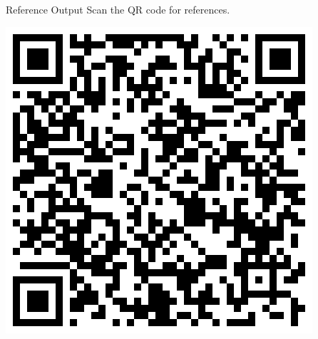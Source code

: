 \documentclass[final]{beamer}
\newlength{\sepwidth}
\newlength{\colwidth}
\newcommand{\separatorcolumn}{\begin{column}{\sepwidth}\end{column}}
\begin{document}
\begin{frame}[t]
\begin{columns}[t]
\begin{column}{\colwidth}
\begin{minipage}[t]{0.7\linewidth}
\end{minipage}
\hfill
\begin{minipage}[t]{0.28\linewidth}
\begin{block}{Reference Output}
 Scan the QR code for references.
\vspace{10pt}
\begin{center}
\includegraphics[width=0.7\linewidth]{Figures/qr.png}
\end{center}
\end{block}

\end{minipage}


\end{column}
\separatorcolumn

\end{columns}
\end{frame}
\end{document}
